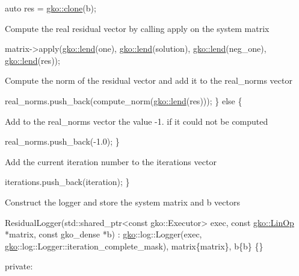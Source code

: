 \begin{DoxyCode}
\textcolor{keyword}{auto} res = \hyperlink{namespacegko_a1beb80750459e4201aa9d882d2d074c3}{gko::clone}(b);
\end{DoxyCode}


Compute the real residual vector by calling apply on the system matrix


\begin{DoxyCode}
matrix->apply(\hyperlink{namespacegko_aa8cb4876b72e5e1036ea9575443c439b}{gko::lend}(one), \hyperlink{namespacegko_aa8cb4876b72e5e1036ea9575443c439b}{gko::lend}(solution),
              \hyperlink{namespacegko_aa8cb4876b72e5e1036ea9575443c439b}{gko::lend}(neg\_one), \hyperlink{namespacegko_aa8cb4876b72e5e1036ea9575443c439b}{gko::lend}(res));
\end{DoxyCode}


Compute the norm of the residual vector and add it to the {\ttfamily real\+\_\+norms} vector


\begin{DoxyCode}
    real\_norms.push\_back(compute\_norm(\hyperlink{namespacegko_aa8cb4876b72e5e1036ea9575443c439b}{gko::lend}(res)));
\} \textcolor{keywordflow}{else} \{
\end{DoxyCode}


Add to the {\ttfamily real\+\_\+norms} vector the value -\/1. if it could not be computed


\begin{DoxyCode}
    real\_norms.push\_back(-1.0);
\}
\end{DoxyCode}


Add the current iteration number to the {\ttfamily iterations} vector


\begin{DoxyCode}
    iterations.push\_back(iteration);
\}
\end{DoxyCode}


Construct the logger and store the system matrix and b vectors


\begin{DoxyCode}
    ResidualLogger(std::shared\_ptr<const gko::Executor> exec,
                   \textcolor{keyword}{const} \hyperlink{classgko_1_1LinOp}{gko::LinOp} *matrix, \textcolor{keyword}{const} gko\_dense *b)
        : \hyperlink{namespacegko}{gko}::log::Logger(exec, \hyperlink{namespacegko}{gko}::log::Logger::iteration\_complete\_mask),
          matrix\{matrix\},
          b\{b\}
    \{\}

\textcolor{keyword}{private}:
\end{DoxyCode}


